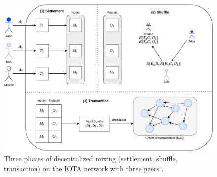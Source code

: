 \begin{figure}[t]
  \centering
   \includegraphics[width=\textwidth]{Images/mixing_iota.pdf}
  \caption{Three phases of decentralized mixing (settlement, shuffle, transaction) on the IOTA network with three peers \cite{Sarfraz2019}.}
  \label{F_mixing_iota}
  \end{figure}
  

  
  
